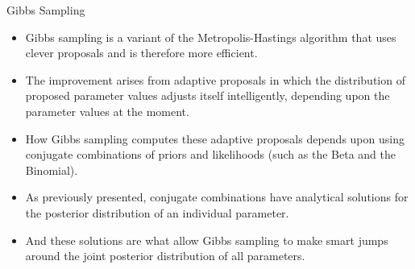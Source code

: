 \documentclass[handout]{beamer}
\begin{document}
\begin{frame}{Gibbs Sampling}
\scriptsize{

\begin{itemize}

\item Gibbs sampling is a variant of the Metropolis-Hastings algorithm that uses clever proposals and is therefore more efficient.

\item The improvement arises from adaptive proposals in which the distribution of proposed parameter values adjusts itself intelligently, depending upon the parameter values at the moment.



\item How Gibbs sampling computes these adaptive proposals depends upon using conjugate combinations of priors and likelihoods (such as the Beta and the Binomial). 

\item As previously presented, conjugate combinations have analytical solutions for the posterior distribution of an individual parameter. 

\item And these solutions are what allow Gibbs sampling to make smart jumps around the joint posterior distribution of all parameters.





\end{itemize}


} 
\end{frame}
\end{document}
